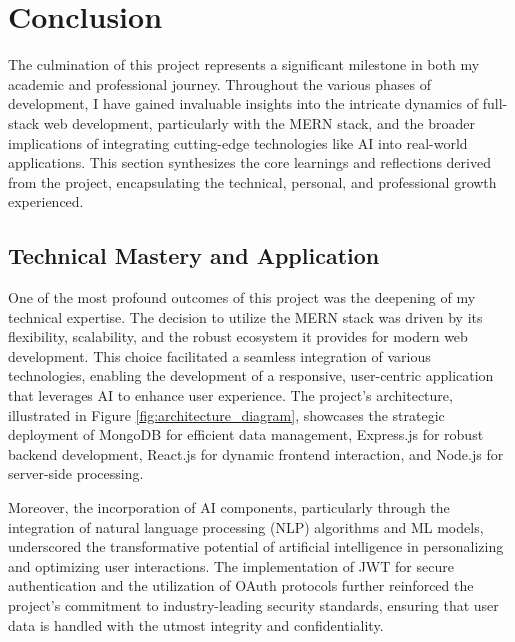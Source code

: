 \section{Conclusion}
The culmination of this project represents a significant milestone in both my academic and professional journey. Throughout the various phases of development, I have gained invaluable insights into the intricate dynamics of full-stack web development, particularly with the \gls{MERN} stack, and the broader implications of integrating cutting-edge technologies like \gls{AI} into real-world applications. This section synthesizes the core learnings and reflections derived from the project, encapsulating the technical, personal, and professional growth experienced.

\subsection{Technical Mastery and Application}
One of the most profound outcomes of this project was the deepening of my technical expertise. The decision to utilize the \gls{MERN} stack was driven by its flexibility, scalability, and the robust ecosystem it provides for modern web development. This choice facilitated a seamless integration of various technologies, enabling the development of a responsive, user-centric application that leverages \gls{AI} to enhance user experience. The project's architecture, illustrated in Figure \ref{fig:architecture_diagram}, showcases the strategic deployment of MongoDB for efficient data management, Express.js for robust backend development, React.js for dynamic frontend interaction, and Node.js for server-side processing. 


Moreover, the incorporation of \gls{AI} components, particularly through the integration of natural language processing (NLP) algorithms and \gls{ML} models, underscored the transformative potential of artificial intelligence in personalizing and optimizing user interactions. The implementation of \gls{JWT} for secure authentication and the utilization of \gls{OAuth} protocols further reinforced the project's commitment to industry-leading security standards, ensuring that user data is handled with the utmost integrity and confidentiality.


